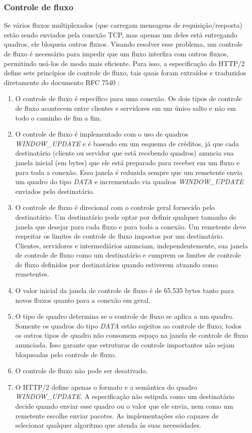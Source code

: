 \subsubsection{Controle de fluxo}

Se vários fluxos multiplexados (que carregam mensagens de requisição\slash resposta) estão sendo enviados pela conexão TCP, mas apenas um deles está entregando quadros, ele bloqueia outros fluxos. Visando resolver esse problema, um controle de fluxo é necessário para impedir que um fluxo interfira com outros fluxos, permitindo usá-los de modo mais eficiente. Para isso, a especificação do HTTP/2 define sete princípios de controle de fluxo, tais quais foram extraídos e traduzidos diretamente do documento RFC 7540 \cite{BelsheRFC7540}:

\begin{enumerate}
    \item O controle de fluxo é específico para uma conexão. Os dois tipos de controle de fluxo acontecem entre clientes e servidores em um único salto e não em todo o caminho de fim a fim.
    \item O controle de fluxo é implementado com o uso de quadros {\em WINDOW\_UPDATE} e é baseado em um esquema de créditos, já que cada destinatário (cliente ou servidor que está recebendo quadros) anuncia sua janela inicial (em bytes) que ele está preparado para receber em um fluxo e para toda a conexão. Essa janela é reduzida sempre que um remetente envia um quadro do tipo {\em DATA} e incrementado via quadros {\em WINDOW\_UPDATE} enviados pelo destinatário.
    \item O controle de fluxo é direcional com o controle geral fornecido pelo destinatário. Um destinatário pode optar por definir qualquer tamanho de janela que desejar para cada fluxo e para toda a conexão. Um remetente deve respeitar os limites de controle de fluxo impostos por um destinatário. Clientes, servidores e intermediários anunciam, independentemente, sua janela de controle de fluxo como um destinatário e cumprem os limites de controle de fluxo definidos por destinatários quando estiverem atuando como remetentes.
    \item O valor inicial da janela de controle de fluxo é de 65.535 bytes tanto para novos fluxos quanto para a conexão em geral.
    \item O tipo de quadro determina se o controle de fluxo se aplica a um quadro. Somente os quadros do tipo {\em DATA} estão sujeitos ao controle de fluxo; todos os outros tipos de quadro não consomem espaço na janela de controle de fluxo anunciada. Isso garante que estruturas de controle importantes não sejam bloqueadas pelo controle de fluxo.
    \item O controle de fluxo não pode ser desativado.
    \item O HTTP/2 define apenas o formato e a semântica do quadro {\em WINDOW\_UPDATE}. A especificação não estipula como um destinatário decide quando enviar esse quadro ou o valor que ele envia, nem como um remetente escolhe enviar pacotes. As implementações são capazes de selecionar qualquer algoritmo que atenda às suas necessidades.
\end{enumerate}

